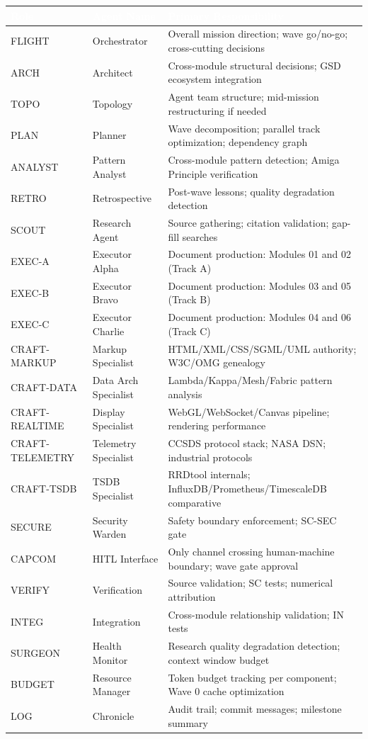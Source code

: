 \documentclass[11pt,letterpaper]{article}
\newcommand{\tableheader}[1]{\textbf{\sffamily\textcolor{white}{#1}}}
\begin{document}
\begin{center}
\begin{tabularx}{\textwidth}{L{2cm}L{3cm}X}
\toprule
{}
\tableheader{Role} & \tableheader{Agent Name} & \tableheader{Primary Responsibility} \\
\midrule
FLIGHT & Orchestrator & Overall mission direction; wave go/no-go; cross-cutting decisions \\
ARCH & Architect & Cross-module structural decisions; GSD ecosystem integration \\
TOPO & Topology & Agent team structure; mid-mission restructuring if needed \\
PLAN & Planner & Wave decomposition; parallel track optimization; dependency graph \\
ANALYST & Pattern Analyst & Cross-module pattern detection; Amiga Principle verification \\
RETRO & Retrospective & Post-wave lessons; quality degradation detection \\
SCOUT & Research Agent & Source gathering; citation validation; gap-fill searches \\
EXEC-A & Executor Alpha & Document production: Modules 01 and 02 (Track A) \\
EXEC-B & Executor Bravo & Document production: Modules 03 and 05 (Track B) \\
EXEC-C & Executor Charlie & Document production: Modules 04 and 06 (Track C) \\
CRAFT-MARKUP & Markup Specialist & HTML/XML/CSS/SGML/UML authority; W3C/OMG genealogy \\
CRAFT-DATA & Data Arch Specialist & Lambda/Kappa/Mesh/Fabric pattern analysis \\
CRAFT-REALTIME & Display Specialist & WebGL/WebSocket/Canvas pipeline; rendering performance \\
CRAFT-TELEMETRY & Telemetry Specialist & CCSDS protocol stack; NASA DSN; industrial protocols \\
CRAFT-TSDB & TSDB Specialist & RRDtool internals; InfluxDB/Prometheus/TimescaleDB comparative \\
SECURE & Security Warden & Safety boundary enforcement; SC-SEC gate \\
CAPCOM & HITL Interface & Only channel crossing human-machine boundary; wave gate approval \\
VERIFY & Verification & Source validation; SC tests; numerical attribution \\
INTEG & Integration & Cross-module relationship validation; IN tests \\
SURGEON & Health Monitor & Research quality degradation detection; context window budget \\
BUDGET & Resource Manager & Token budget tracking per component; Wave 0 cache optimization \\
LOG & Chronicle & Audit trail; commit messages; milestone summary \\
\bottomrule
\end{tabularx}
\end{center}
\end{document}
